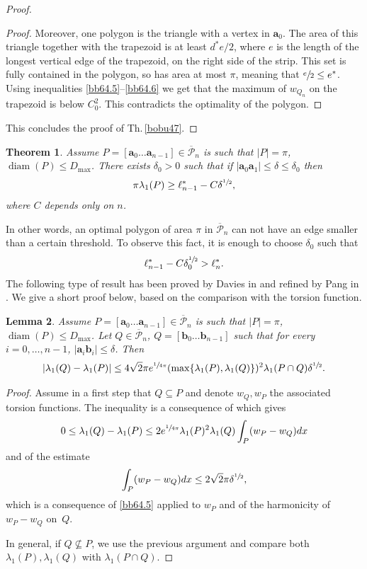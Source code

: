 \documentclass[11pt]{article}
\numberwithin{equation}{section}\newtheorem*{jepEnonce}{\jepEnonceTitle}\newenvironment{enonce*}[1]{\def\jepEnonceTitle{#1}\jepEnonce}{\endjepEnonce}\newtheorem*{conj*}{Conjecture}
\theoremstyle{plain}
\newtheorem{thm}{Theorem}[section]
\newtheorem{lemma}[thm]{Lemma}
\theoremstyle{definition}
\newcommand{\bo}[1]{{\boldsymbol#1}}
\newcommand{\diam}{\operatorname{diam}}
\newcommand{\lb}{\lambda}
\newcommand{\sq}{\subseteq}
\newcommand{\ov}{\overline}
\let\jepOriginalSfrac\sfrac
\renewcommand{\sfrac}[2]{{\jepOriginalSfrac{#1}{#2}}}
\begin{document}
\begin{proof}
\begin{proof}
Moreover, one polygon is the triangle with a vertex in $\bo a_0$. The area of this triangle together with the {trapezoid} is at least $d^* e/2$, where $e$ is the length of the longest vertical edge of the {trapezoid}, on the right side of the strip. This set is fully contained in the polygon, so has area at most $\pi$, meaning that $\sfrac e2 \le e^*$. Using inequalities \eqref{bb64.5}--\eqref{bb64.6} we get that the maximum of $w_{Q_n}$ on the {trapezoid} is below $C_0^2$. This contradicts the optimality of the polygon.
\end{proof}
This concludes the proof of Th.\,\ref{bobu47}.
\end{proof}

\begin{thm}\label{bobu220}
Assume $P=[\bo a_0\dots \bo a_{n-1}] \in \ov {\mathcal P}_n$ is such that $|P|=\pi$, $\diam (P)\le D_{\max}$. There exists $\delta _0 >0$ such that if $|\bo a_0\bo a_1|\le \delta\le \delta_0$ then
\begin{equation}\label{bobu221}
\pi \lb_1(P)\ge \ell_{n-1}^*-C\delta^{\sfrac12},
\end{equation}
where $C $ depends only on $n$.
\end{thm}
In other words, an optimal polygon of area $\pi$ in $\overline {\mathcal P}_n$ can not have an edge smaller than a certain threshold. To observe this fact, it is enough to choose $\delta_0 $ such that
\begin{equation}
\ell_{n-1}^*-C\delta_0^{\sfrac 12}> \ell_n^*.
\label{eq:delta-edge-min}
\end{equation}
The following type of result has been proved by Davies in \cite{Da93} and refined by Pang in \cite{Pa97}. We give a short proof below, based on the comparison with the torsion function.
\begin{lemma}\label{bobu223}
Assume $P=[\bo a_0\dots\bo a_{n-1}] \in \ov {\mathcal P}_n$ is such that $|P|=\pi$, $\diam (P)\le D_{\max}$. Let $Q \in \ov {\mathcal P}_n$, $Q=[\bo b_0\dots\bo b_{n-1}] $ such that for every $i=0, \dots, n-1$, $|\bo a_i\bo b_i|\le \delta$.
Then
\[
|\lb_1(Q)-\lb_1(P)| \le 4 \sqrt{2}\pi e^{\sfrac{1}{4\pi}}(\max \{\lb_1(P), \lb_1(Q)\})^2\lb_1(P\cap Q) \delta^{\sfrac 12}.
\]
\end{lemma}
\begin{proof}
Assume in a first step that $Q \sq P$ and {denote $w_Q, w_P$ the associated torsion functions}.
The inequality is a consequence of \cite[Ineq.\,(2.6)]{BuMa15} which gives
\[
0\le \lb_1(Q)-\lb_1(P) \le 2e^{\sfrac{1}{4\pi}}\lb_1(P)^2\lb_1(Q)\int_P (w_P-w_Q) dx
\]
and of the estimate
\[
\int_P (w_P-w_Q) dx \le 2\sqrt{2} \pi \delta^{\sfrac 12},
\]
which is a consequence of \eqref{bb64.5} applied to $w_P$ and of the harmonicity of $w_P-w_Q$ on~$Q$.

In general, if $Q \not \sq P$, we use the previous argument and compare both $\lb_1(P), \lb_1(Q)$ with $\lb_1(P\cap Q)$.
\end{proof}
\end{document}
